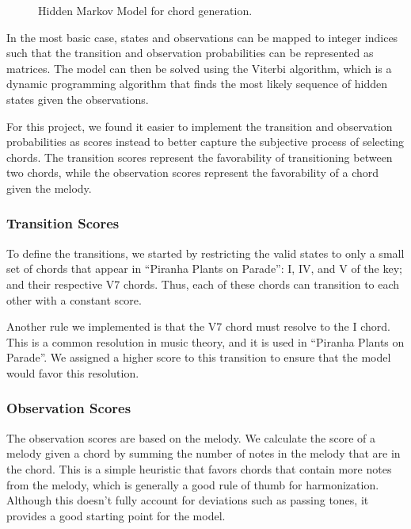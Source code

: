 \begin{figure}
    \centering
    
    \caption{Hidden Markov Model for chord generation.}
    \label{fig:hmm}
\end{figure}

In the most basic case, states and observations can be mapped to integer indices such that the transition and observation probabilities can be represented as matrices. The model can then be solved using the Viterbi algorithm, which is a dynamic programming algorithm that finds the most likely sequence of hidden states given the observations.

For this project, we found it easier to implement the transition and observation probabilities as scores instead to better capture the subjective process of selecting chords. The transition scores represent the favorability of transitioning between two chords, while the observation scores represent the favorability of a chord given the melody.

\subsubsection{Transition Scores}

To define the transitions, we started by restricting the valid states to only a small set of chords that appear in ``Piranha Plants on Parade'': I, IV, and V of the key; and their respective V7 chords. Thus, each of these chords can transition to each other with a constant score.

Another rule we implemented is that the V7 chord must resolve to the I chord. This is a common resolution in music theory, and it is used in ``Piranha Plants on Parade''. We assigned a higher score to this transition to ensure that the model would favor this resolution.

\subsubsection{Observation Scores}

The observation scores are based on the melody. We calculate the score of a melody given a chord by summing the number of notes in the melody that are in the chord. This is a simple heuristic that favors chords that contain more notes from the melody, which is generally a good rule of thumb for harmonization. Although this doesn't fully account for deviations such as passing tones, it provides a good starting point for the model.
